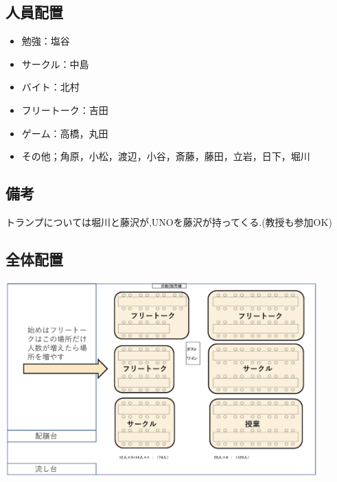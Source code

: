 \subsection{人員配置}
\begin{itemize}
\item 勉強：塩谷
\item サークル：中島
\item バイト：北村
\item フリートーク：吉田
\item ゲーム：高橋，丸田
\item その他；角原，小松，渡辺，小谷，斎藤，藤田，立岩，日下，堀川
\end{itemize}
\subsection{備考}
トランプについては堀川と藤沢が,UNOを藤沢が持ってくる.(教授も参加OK)
\subsection{全体配置}
\begin{center}
\includegraphics[width=12cm]{./13/hone.eps}
\end{center}
